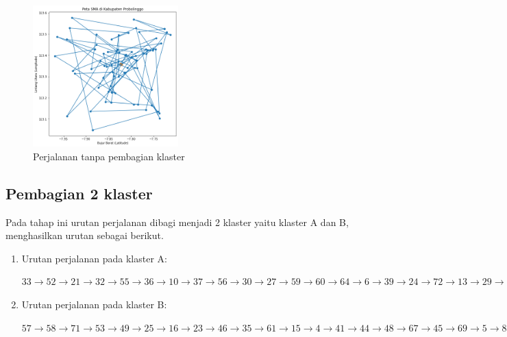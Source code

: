 \begin{figure}[H]
\centering
\includegraphics[width=0.5\textwidth]{Gambar/hasil_mtsp/1}
\caption{Perjalanan tanpa pembagian klaster}
\label{fig:hasil_mtsp1}
\end{figure}

\subsection{Pembagian 2 klaster}

Pada tahap ini urutan perjalanan dibagi menjadi 2 klaster yaitu klaster A dan B, menghasilkan urutan sebagai berikut.

\begin{enumerate}
\item Urutan perjalanan pada klaster A:

$33\rightarrow52\rightarrow21\rightarrow32\rightarrow55\rightarrow36\rightarrow10\rightarrow37\rightarrow56\rightarrow30\rightarrow27\rightarrow59\rightarrow60\rightarrow64\rightarrow6\rightarrow39\rightarrow24\rightarrow72\rightarrow13\rightarrow29\rightarrow11\rightarrow63\rightarrow9\rightarrow17\rightarrow47\rightarrow38$

\item Urutan perjalanan pada klaster B:

$57\rightarrow58\rightarrow71\rightarrow53\rightarrow49\rightarrow25\rightarrow16\rightarrow23\rightarrow46\rightarrow35\rightarrow61\rightarrow15\rightarrow4\rightarrow41\rightarrow44\rightarrow48\rightarrow67\rightarrow45\rightarrow69\rightarrow5\rightarrow8\rightarrow42\rightarrow50\rightarrow22\rightarrow51\rightarrow74\rightarrow26\rightarrow19\rightarrow34\rightarrow43\rightarrow65\rightarrow12\rightarrow28\rightarrow14\rightarrow70\rightarrow66\rightarrow3\rightarrow40\rightarrow20\rightarrow62\rightarrow31\rightarrow18\rightarrow7\rightarrow54\rightarrow68\rightarrow73\rightarrow75\rightarrow2\rightarrow1$

\end{enumerate}


